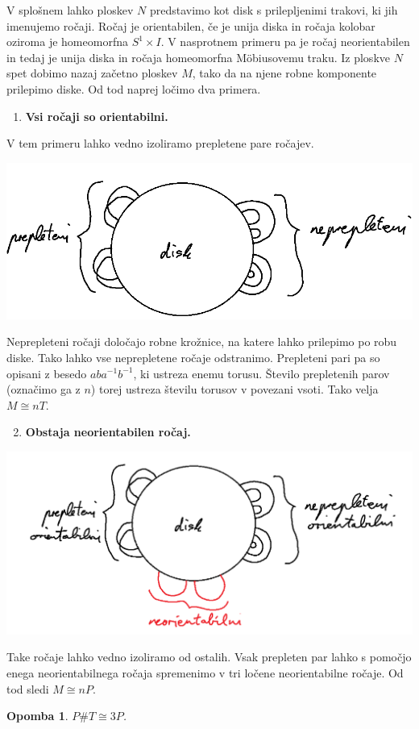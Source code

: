 \documentclass[10pt, a4paper]{article}
\newtheorem*{opomba}{Opomba}
\begin{document}
V splošnem lahko ploskev $N$ predstavimo kot disk s prilepljenimi trakovi,
ki jih imenujemo ročaji.
Ročaj je orientabilen, če je unija diska in ročaja kolobar oziroma je 
homeomorfna $S^1 \times I$.
V nasprotnem primeru pa je ročaj neorientabilen in tedaj je unija diska in 
ročaja homeomorfna Möbiusovemu traku.
Iz ploskve $N$ spet dobimo nazaj začetno ploskev $M$,
tako da na njene robne komponente prilepimo diske.
Od tod naprej ločimo dva primera.

\begin{enumerate}
  \item \textbf{Vsi ročaji so orientabilni.}
\end{enumerate}

V tem primeru lahko vedno izoliramo prepletene
pare ročajev.

\begin{center}
  \includegraphics[scale=0.7]{klasifikacija4.png}
\end{center}

Neprepleteni ročaji določajo robne krožnice, na katere lahko prilepimo po robu diske.
Tako lahko vse neprepletene ročaje odstranimo.
Prepleteni pari pa so opisani z besedo $aba^{-1}b^{-1}$,
ki ustreza enemu torusu. Število prepletenih parov (označimo ga z $n$) torej ustreza številu torusov v povezani vsoti.
Tako velja $M \cong nT$.

\begin{enumerate}
  \setcounter{enumi}{1}
  \item \textbf{Obstaja neorientabilen ročaj.}
\end{enumerate}

\begin{center}
  \includegraphics[scale=0.7]{klasifikacija5.png}
\end{center}

Take ročaje lahko vedno izoliramo od ostalih.
Vsak prepleten par lahko s pomočjo enega neorientabilnega ročaja
spremenimo v tri ločene neorientabilne ročaje.
Od tod sledi $M \cong nP$.

\begin{opomba}
  $P \# T \cong 3P$.
\end{opomba}
\end{document}
